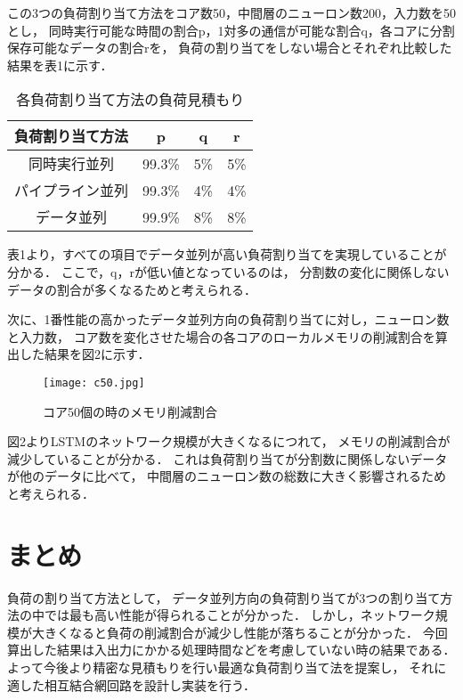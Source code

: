 \documentclass[a4j]{jarticle}
\begin{document}
\begin{Abstract}
この3つの負荷割り当て方法をコア数50，中間層のニューロン数200，入力数を50とし，
同時実行可能な時間の割合p，1対多の通信が可能な割合q，各コアに分割保存可能なデータの割合rを，
負荷の割り当てをしない場合とそれぞれ比較した結果を表1に示す．
\begin{table}[htb]
   \begin{center}
     \caption{各負荷割り当て方法の負荷見積もり}
     \begin{tabular}{|c||c|c|c|}\hline
      負荷割り当て方法 & p & q &  r \\ \hline
      同時実行並列 & 99.3\% &  5\% &  5\% \\ \hline
      パイプライン並列 & 99.3\% &  4\% &  4\% \\ \hline
      データ並列 & 99.9\% &  8\% &  8\% \\ \hline
    \end{tabular}
  \end{center}
\end{table}


表1より，すべての項目でデータ並列が高い負荷割り当てを実現していることが分かる．
ここで，q，rが低い値となっているのは，
分割数の変化に関係しないデータの割合が多くなるためと考えられる．

次に、1番性能の高かったデータ並列方向の負荷割り当てに対し，ニューロン数と入力数，
コア数を変化させた場合の各コアのローカルメモリの削減割合を算出した結果を図2に示す．

\begin{figure}[h]
 \centering
 \texttt{[image: c50.jpg]}
 \caption{コア50個の時のメモリ削減割合}
\end{figure}

図2よりLSTMのネットワーク規模が大きくなるにつれて，
メモリの削減割合が減少していることが分かる．
これは負荷割り当てが分割数に関係しないデータが他のデータに比べて，
中間層のニューロン数の総数に大きく影響されるためと考えられる．

 \section{まとめ}
負荷の割り当て方法として，
データ並列方向の負荷割り当てが3つの割り当て方法の中では最も高い性能が得られることが分かった．
しかし，ネットワーク規模が大きくなると負荷の削減割合が減少し性能が落ちることが分かった．
今回算出した結果は入出力にかかる処理時間などを考慮していない時の結果である．
よって今後より精密な見積もりを行い最適な負荷割り当て法を提案し，
それに適した相互結合網回路を設計し実装を行う．



\end{Abstract}
\end{document}
